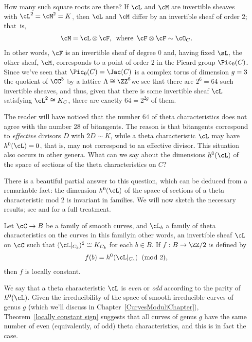 How many such square roots are there? If $\cL$ and $\cM$ are invertible
sheaves with $\cL^2 = \cM^2 = K$, then $\cL$ and $\cM$ differ by an
invertible sheaf of order 2; that~is,
$$
\cM = \cL \otimes \cF, \quad \text{where} \quad \cF \otimes \cF \sim
\cO_C.
$$
In other words, $\cF$ is an invertible sheaf of degree 0 and, having
fixed $\sL$,  the other sheaf, $\cM$, corresponds to a point of order
2 in the
Picard group
%
$\Pic_0(C)$. Since we've seen that $\Pic_0(C) =
\Jac(C)$ is a complex torus of dimension
$g =\nobreak 3$\emdash the quotient of $\CC^3$
by a lattice $\Lambda \cong \ZZ^6$\emdash we see that there are $2^6 = 64$
such invertible sheaves, and thus, given that there is some invertible
sheaf $\cL$ satisfying $\cL^2 \cong K_C$, there are exactly $64 = 2^{2g}$
of them.

The reader will have noticed that the number 64 of theta characteristics
does not agree with the number 28 of bitangents. The reason is
that
bitangents correspond to \emph{effective} divisors $D$ with $2D
\sim K$, while a theta characteristic $\cL$ may have $h^0(\cL) = 0$,
that is, may not correspond to an effective divisor.
This situation also occurs in other genera.
What can we say about the dimensions $h^0(\cL)$ of the space of sections
of the theta characteristics on $C$?

 There is a beautiful partial answer to this question, which can be
 deduced from a remarkable fact: the dimension $h^0(\cL)$ of the space
 of sections of a theta characteristic mod 2 is invariant in families.
We will now
sketch the necessary results; see \cite{MumfordPaper} and \cite{JHPaper}
for a full treatment.

 \begin{theorem}
 \label{locally constant sign}
 Let $\cC \to B$ be a family of smooth curves, and $\cL_b$ a family of
 theta characteristics on the curves in this family\emdash in other words, an
 invertible sheaf $\cL$ on $\cC$ such that $(\cL|_{C_b})^2 \cong K_{C_b}$
 for each $b \in B$.
If
$f : B \to \ZZ/2$
is defined by
 $$
 f(b) = h^0(\cL|_{C_b}) \;  \; (\mathrm{mod\ } 2),
 $$
then $f$ is locally constant.
\unif
\end{theorem}

We say that a theta characteristic $\cL$ is \emph{even} or \emph{odd}
%
according to the parity of $h^0(\cL)$. Given the irreducibility of the
space of smooth irreducible curves of genus $g$ (which we'll discuss
in Chapter~\ref{CurvesModuliChapter}),
Theorem~\ref{locally constant sign}
suggests that all curves of genus $g$ have the same number of
even (equivalently, of odd) theta characteristics, and this is in fact
the case.

